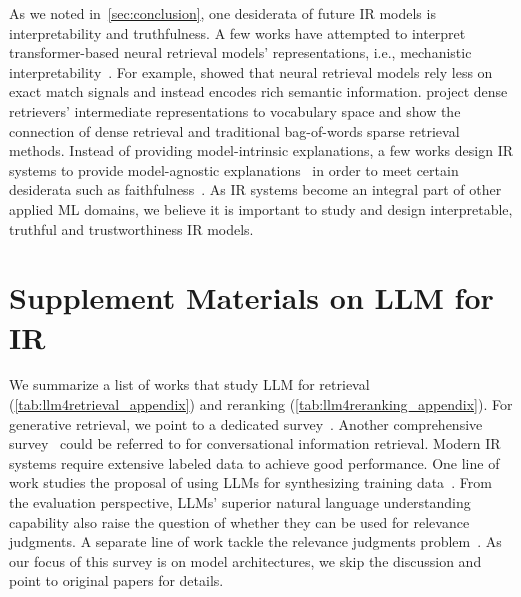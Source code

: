 As we noted in~\cref{sec:conclusion}, one desiderata of future IR models is interpretability and truthfulness. A few works have attempted to interpret transformer-based neural retrieval models' representations, i.e., mechanistic interpretability~\cite{elhage2021mathematical,saphra2024mechanistic}. 
For example, \citet{macavaney-etal-2022-abnirml} showed that neural retrieval models rely less on exact match signals and instead encodes rich semantic information. \citet{ram-etal-2023-token} project dense retrievers' intermediate representations to vocabulary space and show the connection of dense retrieval and traditional bag-of-words sparse retrieval methods. 
Instead of providing model-intrinsic explanations, a few works design IR systems to provide model-agnostic explanations~\cite{rahimi2021explaining,yu2022towards,xu2024cfe2} in order to meet certain desiderata such as faithfulness~\cite{jacovi-goldberg-2020-towards,xu2023reusable}. As IR systems become an integral part of other applied ML domains, we believe it is important to study and design interpretable, truthful and trustworthiness IR models. 



\section{Supplement Materials on LLM for IR}
\label{appendix:llm4ir}

We summarize a list of works that study LLM for retrieval (\cref{tab:llm4retrieval_appendix}) and reranking (\cref{tab:llm4reranking_appendix}). For generative retrieval, we point to a dedicated survey~\cite{li2024matching}. Another comprehensive survey~\cite{mo2024survey} could be referred to for conversational information retrieval. Modern IR systems require extensive labeled data to achieve good performance. One line of work studies the proposal of using LLMs for synthesizing training data~\cite{bonifacio2022inpars,boytsov2024inpars,dai2023promptagator,lee2024gecko,mo2024chiq,mo2024convsdg}. From the evaluation perspective, LLMs' superior natural language understanding capability also raise the question of whether they can be used for relevance judgments. A separate line of work tackle the relevance judgments problem~\cite{faggioli2023perspectives,faggioli2024determines,clarke2024llm}. As our focus of this survey is on model architectures, we skip the discussion and point to original papers for details.



